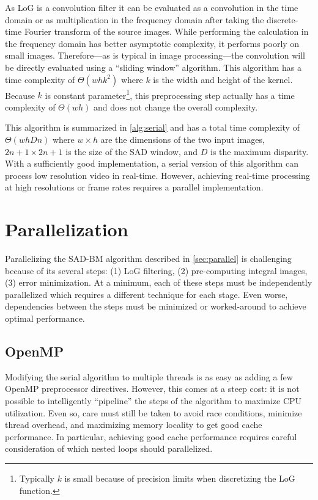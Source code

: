 \documentclass{article}
\let\orgautoref\autoref
\providecommand{\Cref}
        {\def\equationautorefname{Equation}%
         \def\figureautorefname{Figure}%
         \def\subfigureautorefname{Figure}%
         \def\Itemautorefname{Item}%
         \def\tableautorefname{Table}%
         \def\sectionautorefname{Section}%
         \def\subsectionautorefname{Section}%
         \def\subsubsectionautorefname{Section}%
         \def\chapterautorefname{Section}%
         \def\partautorefname{Part}%
         \orgautoref}
\begin{document}
As LoG is a convolution filter it can be evaluated as a convolution in the time
domain or as multiplication in the frequency domain after taking the
discrete-time Fourier transform of the source images. While performing the
calculation in the frequency domain has better asymptotic complexity, it
performs poorly on small images. Therefore---as is typical in image
processing---the convolution will be directly evaluated using a ``sliding
window'' algorithm. This algorithm has a time complexity of $\Theta(whk^2)$
where $k$ is the width and height of the kernel. Because $k$ is constant
parameter\footnote{Typically $k$ is small because of precision limits when
discretizing the LoG function.}, this preprocessing step actually has a time
complexity of $\Theta(wh)$ and does not change the overall complexity.

This algorithm is summarized in \Cref{alg:serial} and has a total time
complexity of $\Theta(whDn)$ where $w \times h$ are the dimensions of the two
input images, $2n + 1 \times 2n + 1$ is the size of the SAD window, and $D$ is
the maximum disparity. With a sufficiently good implementation, a serial
version of this algorithm can process low resolution video in real-time.
However, achieving real-time processing at high resolutions or frame rates
requires a parallel implementation.

\section{Parallelization}
\label{sec:parallel}
Parallelizing the SAD-BM algorithm described in \Cref{sec:parallel} is
challenging because of its several steps: (1) LoG filtering, (2) pre-computing
integral images, (3) error minimization. At a minimum, each of these steps must
be independently parallelized which requires a different technique for each
stage. Even worse, dependencies between the steps must be minimized or
worked-around to achieve optimal performance.

\subsection{OpenMP}
\label{sec:parallel-omp}
Modifying the serial algorithm to multiple threads is as easy as adding a few
OpenMP preprocessor directives. However, this comes at a steep cost: it is not
possible to intelligently ``pipeline'' the steps of the algorithm to maximize
CPU utilization. Even so, care must still be taken to avoid race conditions,
minimize thread overhead, and maximizing memory locality to get good cache
performance. In particular, achieving good cache performance requires careful
consideration of which nested loops should parallelized. 
\end{document}
